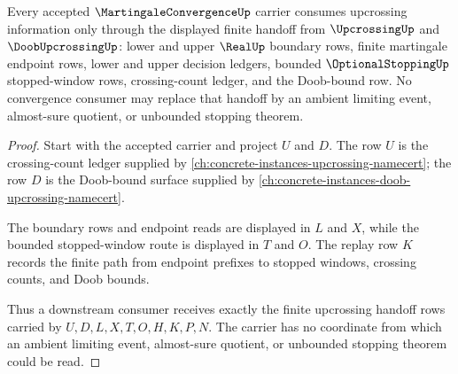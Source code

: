 \begin{theorem}
\label{thm:martingale-convergence-upcrossing-route}
Every accepted $\MartingaleConvergenceUp$ carrier consumes upcrossing information only through the displayed finite handoff from $\UpcrossingUp$ and $\DoobUpcrossingUp$: lower and upper $\RealUp$ boundary rows, finite martingale endpoint rows, lower and upper decision ledgers, bounded $\OptionalStoppingUp$ stopped-window rows, crossing-count ledger, and the Doob-bound row. No convergence consumer may replace that handoff by an ambient limiting event, almost-sure quotient, or unbounded stopping theorem.
\end{theorem}
\begin{proof}
Start with the accepted carrier and project $U$ and $D$. The row $U$ is the crossing-count ledger supplied by \autoref{ch:concrete-instances-upcrossing-namecert}; the row $D$ is the Doob-bound surface supplied by \autoref{ch:concrete-instances-doob-upcrossing-namecert}.

The boundary rows and endpoint reads are displayed in $L$ and $X$, while the bounded stopped-window route is displayed in $T$ and $O$. The replay row $K$ records the finite path from endpoint prefixes to stopped windows, crossing counts, and Doob bounds.

Thus a downstream consumer receives exactly the finite upcrossing handoff rows carried by $U,D,L,X,T,O,H,K,P,N$. The carrier has no coordinate from which an ambient limiting event, almost-sure quotient, or unbounded stopping theorem could be read.
\end{proof}

